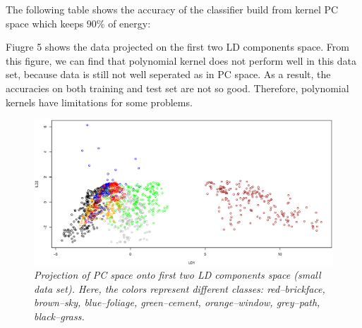\documentclass{article}
\begin{document}
The following table shows the accuracy of the classifier build from kernel PC space which keeps $90\%$ of energy:

 
Fiugre 5 shows the data projected on the first two LD components space. From this figure, we can find that polynomial kernel does not perform well
in this data set, because data is still not well seperated as in PC space. As a result, the accuracies on both training and test set are not so
good. Therefore, polynomial kernels have limitations for some problems.

\begin{figure}[htp]
\centering
\includegraphics[width=12.1cm]{small_kpca_lda_poly_LD12.eps}
\caption{\textit{Projection of PC space onto first two LD components space (small data set). Here, the colors represent different classes: red--brickface, brown--sky, 
blue--foliage, green--cement, orange--window, grey--path, black--grass.}}
\end{figure}
\end{document}
